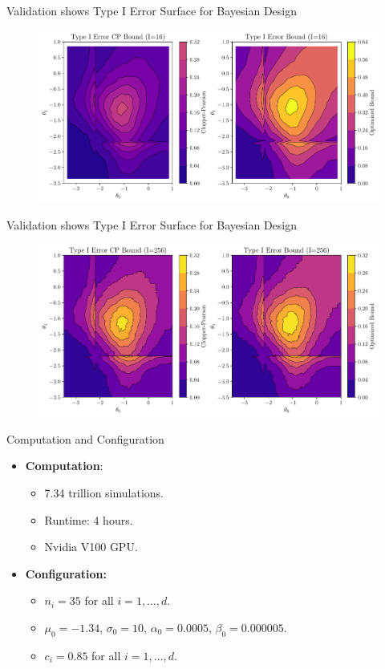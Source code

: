 \begin{frame}{Validation shows Type I Error Surface for Bayesian Design}
\begin{figure}
    \centering
    \includegraphics[width=\linewidth]{figs/berry_3.pdf}
\end{figure}
\end{frame}

\begin{frame}{Validation shows Type I Error Surface for Bayesian Design}
\begin{figure}
    \centering
    \includegraphics[width=\linewidth]{figs/berry_4.pdf}
\end{figure}
\end{frame}

\begin{frame}{\citet{berry:2013} Computation and Configuration}
\begin{itemize}
    \item \textbf{Computation}:
    \begin{itemize}
        \item 7.34 trillion simulations.
        \item Runtime: 4 hours.
        \item Nvidia V100 GPU.
    \end{itemize}
    \item \textbf{Configuration:}
    \begin{itemize}
        \item $n_i = 35$ for all $i=1,\ldots, d$.
        \item $\mu_0=-1.34$, $\sigma_0 = 10$, $\alpha_0 = 0.0005$, 
            $\beta_0 = 0.000005$.
        \item $c_i = 0.85$ for all $i=1,\ldots, d$.
    \end{itemize}
\end{itemize} 
\end{frame}


